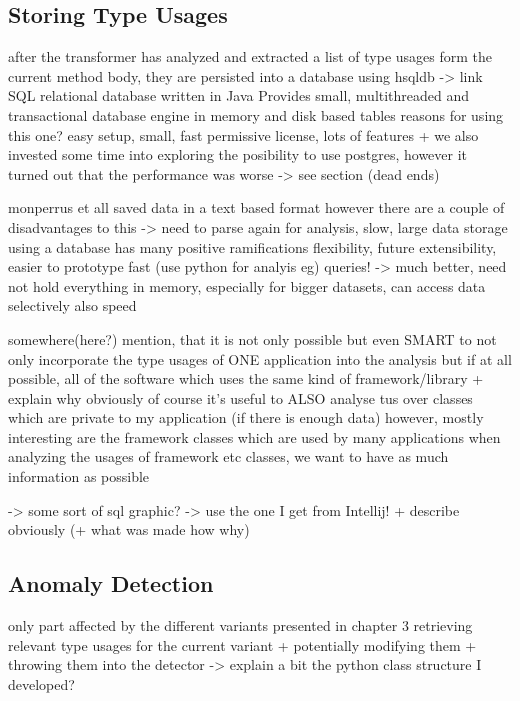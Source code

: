 \subsection{Storing Type Usages}

after the transformer has analyzed and extracted a list of type usages form the current method body, they are persisted into a database
using hsqldb -> link
SQL relational database written in Java
Provides small, multithreaded and transactional database engine
in memory and disk based tables 
reasons for using this one?
easy setup, small, fast
permissive license, lots of features
+ we also invested some time into exploring the posibility to use postgres, however it turned out that the performance was worse -> see section (dead ends)

monperrus et all saved data in a text based format
however there are a couple of disadvantages to this
-> need to parse again for analysis, slow, large data storage
using a database has many positive ramifications
flexibility, future extensibility, easier to prototype fast (use python for analyis eg)
queries! -> much better, need not hold everything in memory, especially for bigger datasets, can access data selectively
also speed

somewhere(here?) mention, that it is not only possible but even SMART to not only incorporate the type usages of ONE application into the analysis but if at all possible, all of the software which uses the same kind of framework/library
+ explain why obviously
    of course it's useful to ALSO analyse tus over classes which are private to my application (if there is enough data)
    however, mostly interesting are the framework classes which are used by many applications
    when analyzing the usages of framework etc classes, we want to have as much information as possible

-> some sort of sql graphic? -> use the one I get from Intellij!
+ describe obviously (+ what was made how why)

\subsection{Anomaly Detection}\label{sec:anomaly}
only part affected by the different variants presented in chapter 3
retrieving relevant type usages for the current variant + potentially modifying them + throwing them into the detector
-> explain a bit the python class structure I developed?

